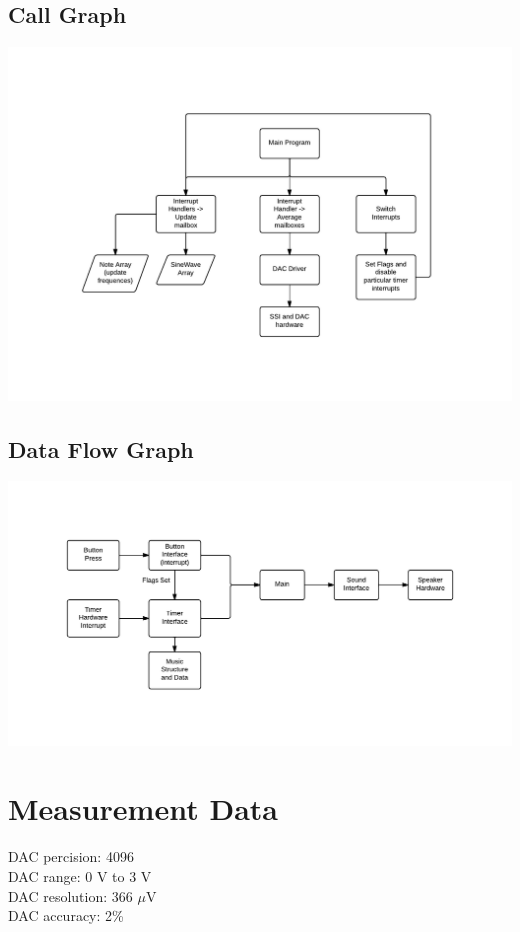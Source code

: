 \documentclass[twoside]{article}
\begin{document}
\subsection*{Call Graph}
\includegraphics[width=\textwidth]{CallGraph_lab5}
\subsection*{Data Flow Graph}
\includegraphics[width=\textwidth]{DataFlowGraph_lab5}


\section*{Measurement Data}

DAC percision: 4096 \\
DAC range: 0 V to 3 V\\
DAC resolution: 366 $\mu$V\\
DAC accuracy: 2\%
\end{document}
